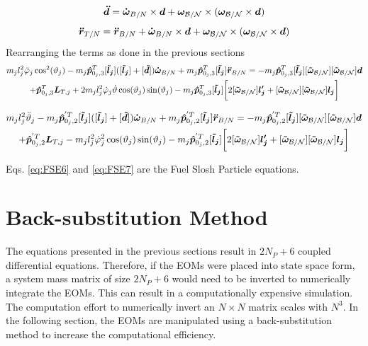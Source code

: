 \documentclass[]{BasiliskReportMemo}
\begin{document}
	\begin{equation}
	\bm{\ddot{d}}=\bm{\dot{\omega}}_{B/N}\times \bm{d}+\bm\omega_{\cal B/N}\times(\bm\omega_{\cal B/N}\times \bm{d})
	\end{equation}
	\begin{equation}
    \bm{\ddot{r}}_{T/N} = \bm{\ddot{r}}_{B/N} + \bm{\dot{\omega}}_{B/N}\times \bm{d}+\bm\omega_{\cal B/N}\times(\bm\omega_{\cal B/N}\times \bm{d})
    \end{equation}
	Rearranging the terms as done in the previous sections
	\begin{multline}
	m_j l_j^2\ddot{\varphi}_j\cos^2(\vartheta_j) -m_{j} \bm{\hat{p}}_{0_j,3}^T [\bm{\tilde{l}_j}]([\bm{\tilde{l}_j}]+ [\bm{\tilde{d}}]) \bm{\dot{\omega}}_{B/N} +m_{j} \bm{\hat{p}}_{0_j,3}^{T} [\bm{\tilde{l}_j}] \bm{\ddot{r}}_{B/N} =-m_{j} \bm{\hat{p}}_{0_j,3}^{T} [\bm{\tilde{l}_j}][\bm{\tilde{\omega}}_{\cal B/N}][\bm{\tilde{\omega}}_{\cal B/N}] \bm{d}\\+\bm{\hat{p}}_{0_j,3}^T \bm{L}_{T,j}+2m_j l_j^2\dot{\varphi}_j\dot{\vartheta}\cos(\vartheta_j)\sin(\vartheta_j)- m_j \bm{\hat{p}}_{0_j,3}^T [\bm{\tilde{l}_j}]\bigg[2[\bm{\tilde{\omega}}_{\cal B/N}] \bm{l_j'}+[\bm{\tilde{\omega}}_{\cal B/N}][\bm{\tilde{\omega}}_{\cal B/N}] \bm{l_j}\bigg]
	\label{eq:FSE6}
	\end{multline}
	
	\begin{multline}
	m_j l_j^2\ddot{\vartheta}_j - m_{j}\bm{\hat{p}}_{0_j,2}^{'T} [\bm{\tilde{l}_j}]( [\bm{\tilde{l}_j}] + [\bm{\tilde{d}}])\bm{\dot{\omega}}_{B/N}
	+m_{j} \bm{\hat{p}}_{0_j,2}^{'T} [\bm{\tilde{l}_j}] \bm{\ddot{r}}_{B/N}
	=-m_{j} \bm{\hat{p}}_{0_j,2}^{'T}[\bm{\tilde{l}_j}][\bm{\tilde{\omega}}_{\cal B/N}][\bm{\tilde{\omega}}_{\cal B/N}] \bm{d}\\+\bm{\hat{p}}_{0_j,2}^{'T} \bm{L}_{T,j}-m_j l_j^2\dot{\varphi}_j^2\cos(\vartheta_j)\sin(\vartheta_j)- m_j \bm{\hat{p}}_{0_j,2}^{'T} [\bm{\tilde{l}_j}]\bigg[2[\bm{\tilde{\omega}}_{\cal B/N}] \bm{l_j'}+[\bm{\tilde{\omega}}_{\cal B/N}][\bm{\tilde{\omega}}_{\cal B/N}] \bm{l_j}\bigg]
	\label{eq:FSE7}
	\end{multline}
	
	Eqs. \eqref{eq:FSE6} and \eqref{eq:FSE7} are the Fuel Slosh Particle equations.
	
	
	\section{Back-substitution Method}
	
	The equations presented in the previous sections result in $2N_P + 6$ coupled differential equations. Therefore, if the EOMs were placed into state space form, a system mass matrix of size $2N_P + 6$ would need to be inverted to numerically integrate the EOMs. This can result in a computationally expensive simulation. The computation effort to numerically invert an $N\times N$ matrix scales with $N^{3}$. In the following section, the EOMs are manipulated using a back-substitution method to increase the computational efficiency. 
	
\end{document}
